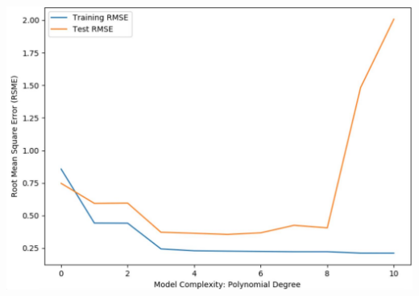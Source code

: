 \documentclass[11pt]{article}
\begin{document}
\begin{center}
    \includegraphics[scale=0.16]{4i.png}
\end{center}
\end{document}
